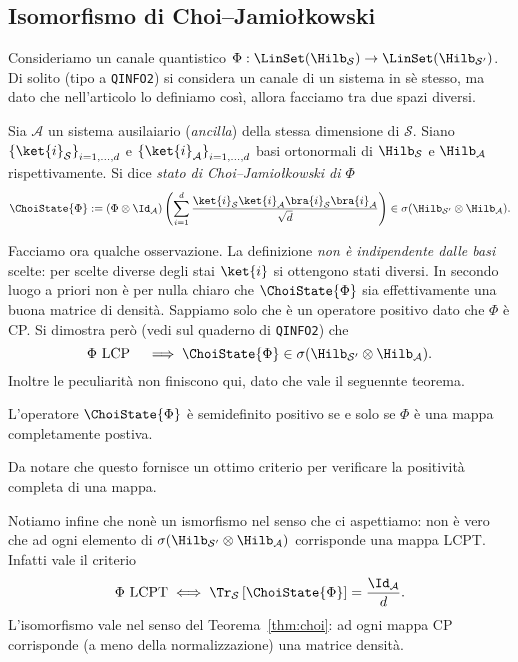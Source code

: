 \documentclass[a4]{article}
\begin{document}
\subsection{Isomorfismo di Choi–Jamiołkowski}
Consideriamo un canale quantistico \(\Phi: \LinSet(\Hilb_\mathcal{S}) \to
\LinSet(\Hilb_\mathcal{S'})\). Di solito (tipo a \texttt{QINFO2}) si considera un canale di
un sistema in sè stesso, ma dato che nell'articolo lo definiamo così, allora facciamo tra
due spazi diversi.
\begin{defn}
Sia \(\mathcal{A}\) un sistema ausilaiario (\emph{ancilla}) della stessa dimensione di
\(\mathcal{S}\). Siano \( \left\{\ket{i}_\mathcal{S}\right\}_{i=1,\dots,d} \)  e
\(\left\{\ket{i}_\mathcal{A}\right\}_{i=1,\dots,d}\) basi ortonormali di \(\Hilb_\mathcal{S}\) e
\(\Hilb_\mathcal{A}\) rispettivamente. Si dice \emph{stato di Choi–Jamiołkowski di \(\Phi\)}
\[\ChoiState{\Phi} := \left( \Phi \otimes \Id_\mathcal{A}\right) 
  \left(\sum_{i=1}^d \frac{\ket{i}_\mathcal{S} \ket{i}_\mathcal{A} \bra{i}_\mathcal{S}
  \bra{i}_\mathcal{A}}{\sqrt{d}}\right) \in \sigma(\Hilb_\mathcal{S'} \otimes \Hilb_\mathcal{A}).\]
\end{defn}
Facciamo ora qualche osservazione. La definizione \emph{non è indipendente dalle basi} scelte:
per scelte diverse degli stai \(\ket{i}\) si ottengono stati diversi. In secondo luogo a priori
non è per nulla chiaro che \(\ChoiState{\Phi}\) sia effettivamente una buona matrice 
di densità. Sappiamo solo che è un operatore positivo dato che \(\Phi\) è CP. Si dimostra però
(vedi sul quaderno di \texttt{QINFO2}) che
\[\Phi\text{ LCP} \quad \implies \ChoiState{\Phi} \in \sigma(\Hilb_\mathcal{S'}
\otimes \Hilb_\mathcal{A}).\]
Inoltre le peculiarità non finiscono qui, dato che vale il seguennte teorema.
\begin{thm} \label{thm:choi}
L'operatore \(\ChoiState{\Phi}\) è semidefinito positivo se e solo se \(\Phi\) è una mappa
completamente postiva.
\end{thm}
Da notare che questo fornisce un ottimo criterio per verificare la positività completa di
una mappa.

Notiamo infine che nonè un ismorfismo nel senso che ci aspettiamo: non è vero che ad ogni
elemento di \(\sigma(\Hilb_\mathcal{S'}\otimes \Hilb_\mathcal{A})\) corrisponde una mappa
LCPT. Infatti vale il criterio
\[\Phi\text{ LCPT} \iff \Tr_\mathcal{S}\left[\ChoiState{\Phi}\right]=\frac{\Id_{\mathcal{A}}}{d}.\]
L'isomorfismo vale nel senso del Teorema~\ref{thm:choi}: ad ogni mappa CP corrisponde
(a meno della normalizzazione) una matrice densità. 
\end{document}

